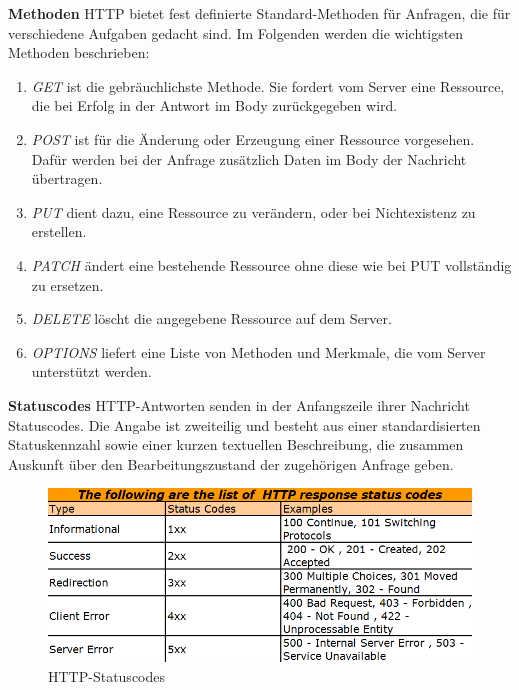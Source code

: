 \textbf{Methoden}
\newline
HTTP bietet fest definierte Standard-Methoden für Anfragen, die für verschiedene Aufgaben gedacht sind. Im Folgenden werden die wichtigsten Methoden beschrieben:
\newline

\begin{enumerate}
		\item \textit{GET} ist die gebräuchlichste Methode. Sie fordert vom Server eine Ressource, die bei Erfolg in der Antwort im Body zurückgegeben wird. 
		
		\item \textit{POST} ist für die Änderung oder Erzeugung einer Ressource vorgesehen. Dafür werden bei der Anfrage zusätzlich Daten im Body der Nachricht übertragen.
		
		\item \textit{PUT} dient dazu, eine Ressource zu verändern, oder bei Nichtexistenz zu erstellen.
	
		\item \textit{PATCH} ändert eine bestehende Ressource ohne diese wie bei PUT vollständig zu ersetzen. 
		
		\item \textit{DELETE} löscht die angegebene Ressource auf dem Server.
		
		\item \textit{OPTIONS} liefert eine Liste von Methoden und Merkmale, die vom Server unterstützt werden.
		
\end{enumerate}

\textbf{Statuscodes}
\newline
HTTP-Antworten senden in der Anfangszeile ihrer Nachricht Statuscodes. Die Angabe ist zweiteilig und besteht aus einer standardisierten Statuskennzahl sowie einer kurzen textuellen Beschreibung, die zusammen Auskunft über den Bearbeitungszustand der zugehörigen Anfrage geben.\newline

\begin{figure}[h]
\centering
\includegraphics[width=\textwidth]{images/netzwerkprotokolle_Httpstatuscodes.png}
\caption{HTTP-Statuscodes}
\end{figure}

